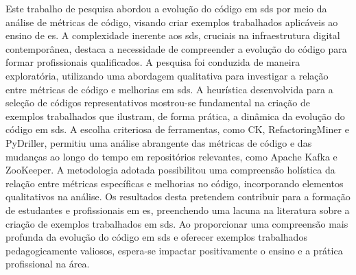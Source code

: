 
\begin{resumoutfpr}%

Este trabalho de pesquisa abordou a evolução do código em \gls{sds} por meio da análise de métricas de código, visando criar exemplos trabalhados aplicáveis ao ensino de \gls{es}. A complexidade inerente aos \gls{sds}, cruciais na infraestrutura digital contemporânea, destaca a necessidade de compreender a evolução do código para formar profissionais qualificados. A pesquisa foi conduzida de maneira exploratória, utilizando uma abordagem qualitativa para investigar a relação entre métricas de código e melhorias em \gls{sds}. A heurística desenvolvida para a seleção de códigos representativos mostrou-se fundamental na criação de exemplos trabalhados que ilustram, de forma prática, a dinâmica da evolução do código em \gls{sds}. A escolha criteriosa de ferramentas, como CK, RefactoringMiner e PyDriller, permitiu uma análise abrangente das métricas de código e das mudanças ao longo do tempo em repositórios relevantes, como Apache Kafka e ZooKeeper. A metodologia adotada possibilitou uma compreensão holística da relação entre métricas específicas e melhorias no código, incorporando elementos qualitativos na análise. Os resultados desta pretendem contribuir para a formação de estudantes e profissionais em \gls{es}, preenchendo uma lacuna na literatura sobre a criação de exemplos trabalhados em \gls{sds}. Ao proporcionar uma compreensão mais profunda da evolução do código em \gls{sds} e oferecer exemplos trabalhados pedagogicamente valiosos, espera-se impactar positivamente o ensino e a prática profissional na área.

\end{resumoutfpr}
